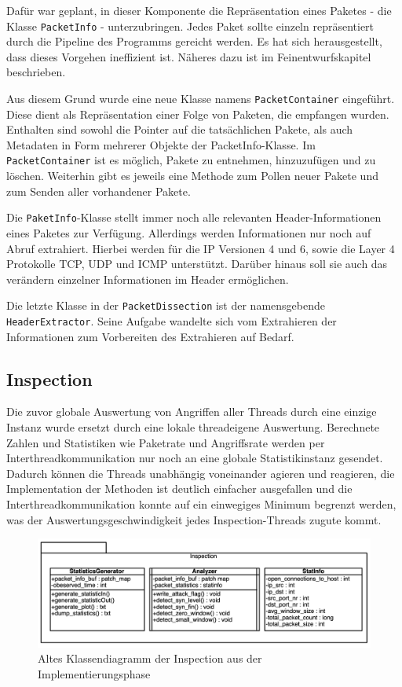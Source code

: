\documentclass[../review_2.tex]{subfiles}
\begin{document}
Dafür war geplant, in dieser Komponente die Repräsentation eines Paketes - die Klasse \texttt{PacketInfo} - unterzubringen. Jedes Paket sollte einzeln repräsentiert durch die Pipeline des Programms gereicht werden. Es hat sich herausgestellt, dass dieses Vorgehen ineffizient ist. Näheres dazu ist im Feinentwurfskapitel beschrieben. 

Aus diesem Grund wurde eine neue Klasse namens \texttt{PacketContainer} eingeführt. Diese dient als Repräsentation einer Folge von Paketen, die empfangen wurden. Enthalten sind sowohl die Pointer auf die tatsächlichen Pakete, als auch Metadaten in Form mehrerer Objekte der PacketInfo-Klasse. Im \texttt{PacketContainer} ist es möglich, Pakete zu entnehmen, hinzuzufügen und zu löschen. Weiterhin gibt es jeweils eine Methode zum Pollen neuer Pakete und zum Senden aller vorhandener Pakete. 

Die \texttt{PaketInfo}-Klasse stellt immer noch alle relevanten Header-Informationen eines Paketes zur Verfügung. Allerdings werden Informationen nur noch auf Abruf extrahiert. Hierbei werden für die IP Versionen 4 und 6, sowie die Layer 4 Protokolle TCP, UDP und ICMP unterstützt. Darüber hinaus soll sie auch das verändern einzelner Informationen im Header ermöglichen.

Die letzte Klasse in der \texttt{PacketDissection} ist der namensgebende \texttt{HeaderExtractor}. Seine Aufgabe wandelte sich vom Extrahieren der Informationen zum Vorbereiten des Extrahieren auf Bedarf.

\subsection{Inspection}

Die zuvor globale Auswertung von Angriffen aller Threads durch eine einzige Instanz wurde ersetzt durch eine lokale threadeigene Auswertung. Berechnete Zahlen und Statistiken wie Paketrate und Angriffsrate werden per Interthreadkommunikation nur noch an eine globale Statistikinstanz gesendet. Dadurch können die Threads unabhängig voneinander agieren und reagieren, die Implementation der Methoden ist deutlich einfacher ausgefallen und die Interthreadkommunikation konnte auf ein einwegiges Minimum begrenzt werden, was der Auswertungsgeschwindigkeit jedes Inspection-Threads zugute kommt.

\begin{figure}[h]
    \centering
    \includegraphics[width=\linewidth]{img/Inspection_old.png}
    \caption{Altes Klassendiagramm der Inspection aus der Implementierungsphase}
    \label{InspectionOld}
\end{figure}
\end{document}
